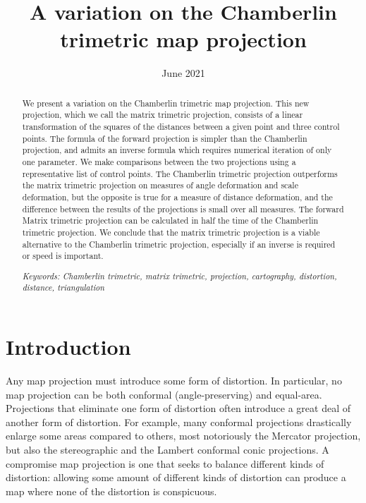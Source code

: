 \documentclass[]{interact}
\title{A variation on the Chamberlin trimetric map projection}
\date{June 2021}
\begin{document}
\maketitle
\begin{abstract}%
   We present a variation on the Chamberlin trimetric map projection. This new
   projection, which we call the matrix trimetric projection, consists of a
   linear transformation of the squares of the distances between a given point
   and three control points. The formula of the forward projection is simpler
   than the Chamberlin projection, and admits an inverse formula which requires
   numerical iteration of only one parameter. We make comparisons between the
   two projections using a representative list of control points. The Chamberlin
   trimetric projection outperforms the matrix trimetric projection on measures
   of angle deformation and scale deformation, but the opposite is true for a
   measure of distance deformation, and the difference between the results of
   the projections is small over all measures. The forward Matrix trimetric
   projection can be calculated in half the time of the Chamberlin trimetric
   projection. We conclude that the matrix
   trimetric projection is a viable alternative to the Chamberlin trimetric
   projection, especially if an inverse is required or speed is important.

   \textit{Keywords: Chamberlin trimetric, matrix trimetric, projection,
   cartography, distortion, distance, triangulation}

\end{abstract}

\section{Introduction}
Any map projection must introduce some form of distortion. In particular, no
map projection can be both conformal (angle-preserving) and equal-area.
Projections that eliminate one form of distortion often introduce a great deal
of another form of distortion. For example, many conformal projections
drastically enlarge some areas compared to others, most notoriously the
Mercator projection, but also the stereographic and the Lambert conformal conic
projections. \citep{snyder87} A compromise map projection is one that seeks to
balance different kinds of distortion: allowing some amount of different kinds
of distortion can produce a map where none of the distortion is conspicuous.
\end{document}
